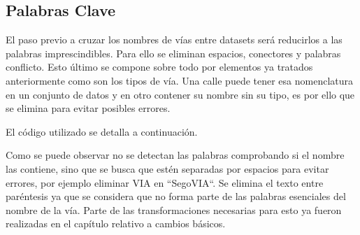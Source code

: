 




\clearpage
\subsection{Palabras Clave}

El paso previo a cruzar los nombres de vías entre datasets será reducirlos a las palabras imprescindibles. Para ello se eliminan espacios, conectores y palabras conflicto. Esto último se compone sobre todo por elementos ya tratados anteriormente como son los tipos de vía. Una calle puede tener esa nomenclatura en un conjunto de datos y en otro contener su nombre sin su tipo, es por ello que se elimina para evitar posibles errores.

El código utilizado se detalla a continuación.









Como se puede observar no se detectan las palabras comprobando si el nombre las contiene, sino que se busca que estén separadas por espacios para evitar errores, por ejemplo eliminar VIA en ``SegoVIA``.
Se elimina el texto entre paréntesis ya que se considera que no forma parte de las palabras esenciales del nombre de la vía.
Parte de las transformaciones necesarias para esto ya fueron realizadas en el capítulo relativo a cambios básicos.




